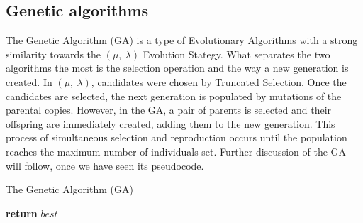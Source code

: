 \subsection{Genetic algorithms} \label{theory-GA}

The Genetic Algorithm (GA) \cite{luke13metaheuristics} is a type of Evolutionary Algorithms with a strong similarity towards the $(\mu,\ \lambda)$ Evolution Stategy. What separates the two algorithms the most is the selection operation and the way a new generation is created. In $(\mu,\ \lambda)$, candidates were chosen by Truncated Selection. Once the candidates are selected, the next generation is populated by mutations of the parental copies. However, in the GA, a pair of parents is selected and their offspring are immediately created, adding them to the new generation. This process of simultaneous selection and reproduction occurs until the population reaches the maximum number of individuals set. Further discussion of the GA will follow, once we have seen its pseudocode.

\begin{algorithm}[H]
    \caption{The Genetic Algorithm (GA)}
    \begin{algorithmic}[1]
            \EndFor
                    \EndIf
                \EndFor
                 
                \EndFor
            \EndWhile
            \State \textbf{return} $best$
        \EndProcedure
    \end{algorithmic}
\end{algorithm}

